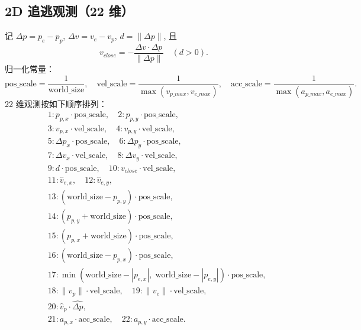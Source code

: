 \documentclass[11pt]{article}
\begin{document}
\subsection{2D 追逃观测（22 维）}
记 $\Delta p = p_e - p_p$, $\Delta v = v_e - v_p$, $d = \|\Delta p\|$, 且
\begin{equation}
 v_{close} = -\frac{\Delta v \cdot \Delta p}{\|\Delta p\|} \quad (d>0).
\end{equation}
归一化常量：
\begin{equation}
\text{pos\_scale}=\frac{1}{\text{world\_size}},\quad
\text{vel\_scale}=\frac{1}{\max(v_{p\_max}, v_{e\_max})},\quad
\text{acc\_scale}=\frac{1}{\max(a_{p\_max}, a_{e\_max})}.
\end{equation}
22 维观测按如下顺序排列：
\begin{align*}
&1: p_{p,x}\cdot\text{pos\_scale}, \quad
2: p_{p,y}\cdot\text{pos\_scale}, \\
&3: v_{p,x}\cdot\text{vel\_scale}, \quad
4: v_{p,y}\cdot\text{vel\_scale}, \\
&5: \Delta p_x\cdot\text{pos\_scale}, \quad
6: \Delta p_y\cdot\text{pos\_scale}, \\
&7: \Delta v_x\cdot\text{vel\_scale}, \quad
8: \Delta v_y\cdot\text{vel\_scale}, \\
&9: d\cdot\text{pos\_scale}, \quad
10: v_{close}\cdot\text{vel\_scale}, \\
&11: \hat{v}_{e,x}, \quad
12: \hat{v}_{e,y}, \\
&13: (\text{world\_size} - p_{p,y})\cdot\text{pos\_scale}, \\
&14: (p_{p,y} + \text{world\_size})\cdot\text{pos\_scale}, \\
&15: (p_{p,x} + \text{world\_size})\cdot\text{pos\_scale}, \\
&16: (\text{world\_size} - p_{p,x})\cdot\text{pos\_scale}, \\
&17: \min(\text{world\_size}-|p_{e,x}|,\;\text{world\_size}-|p_{e,y}|)\cdot\text{pos\_scale}, \\
&18: \|v_p\|\cdot\text{vel\_scale}, \quad
19: \|v_e\|\cdot\text{vel\_scale}, \\
&20: \hat{v}_p\cdot\hat{\Delta p}, \\
&21: a_{p,x}\cdot\text{acc\_scale}, \quad
22: a_{p,y}\cdot\text{acc\_scale}.
\end{align*}
\end{document}
